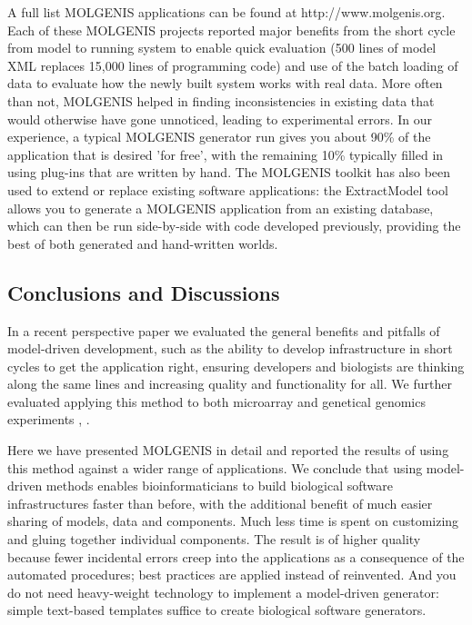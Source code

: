 A full list MOLGENIS applications can be found at http://www.molgenis.org. Each of these MOLGENIS projects 
reported major benefits from the short cycle from model to running system to enable quick evaluation 
(500 lines of model XML replaces 15,000 lines of programming code) and use of the batch loading of 
data to evaluate how the newly built system works with real data. More often than not, MOLGENIS 
helped in finding inconsistencies in existing data that would otherwise have gone unnoticed, leading 
to experimental errors. In our experience, a typical MOLGENIS generator run gives you about 90\% of 
the application that is desired 'for free', with the remaining 10\% typically filled in using plug-ins 
that are written by hand. The MOLGENIS toolkit has also been used to extend or replace existing 
software applications: the ExtractModel tool allows you to generate a MOLGENIS application from an 
existing database, which can then be run side-by-side with code developed previously, providing the 
best of both generated and hand-written worlds.

\subsection{Conclusions and Discussions}
In a recent perspective paper \cite{Swertz:2007} we evaluated the general benefits and pitfalls of model-driven 
development, such as the ability to develop infrastructure in short cycles to get the application 
right, ensuring developers and biologists are thinking along the same lines and increasing quality 
and functionality for all. We further evaluated applying this method to both microarray and genetical 
genomics experiments \cite{Swertz:2004}, \cite{Swertz:2010a}.

Here we have presented MOLGENIS in detail and reported the results of using this method against a 
wider range of applications. We conclude that using model-driven methods enables bioinformaticians 
to build biological software infrastructures faster than before, with the additional benefit of 
much easier sharing of models, data and components. Much less time is spent on customizing and gluing 
together individual components. The result is of higher quality because fewer incidental errors creep 
into the applications as a consequence of the automated procedures; best practices are applied 
instead of reinvented. And you do not need heavy-weight technology to implement a model-driven 
generator: simple text-based templates suffice to create biological software generators.

